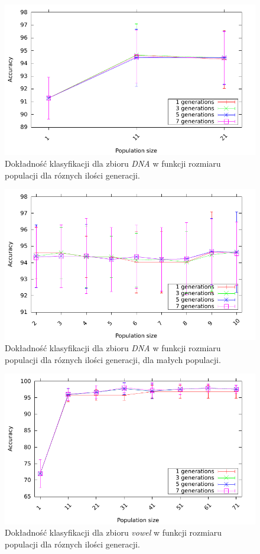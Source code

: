 	\begin{figure}
		\includegraphics[scale=0.90]{figures/accuracy/accuracy-dna}
		\caption{Dokładność klasyfikacji dla zbioru \emph{DNA} w funkcji rozmiaru populacji dla róznych ilości generacji.\label{fig:acc-dna}}
	\end{figure}
	
	\begin{figure}
		\includegraphics[scale=0.90]{figures/accuracy/accuracy-dna-detailed}
		\caption{Dokładność klasyfikacji dla zbioru \emph{DNA} w funkcji rozmiaru populacji dla róznych ilości generacji, dla małych populacji.\label{fig:acc-dna-detailed}}
	\end{figure}	
	

	\begin{figure}
		\includegraphics[scale=0.90]{figures/accuracy/accuracy-vowel}
		\caption{Dokładność klasyfikacji dla zbioru \emph{vowel} w funkcji rozmiaru populacji dla róznych ilości generacji.\label{fig:acc-vowel}}
	\end{figure}
		
